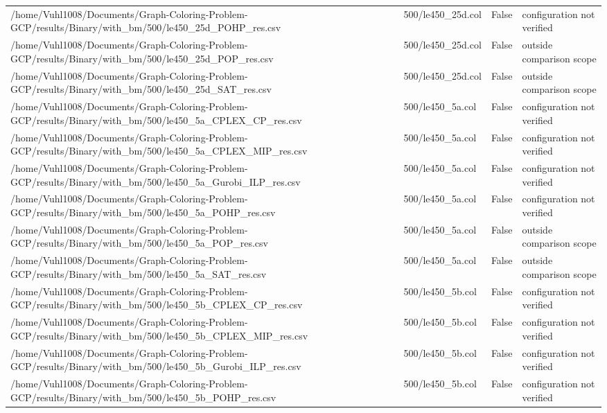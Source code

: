 \begin{table}[htbp]
\begin{tabular}{llll}
/home/Vuhl1008/Documents/Graph-Coloring-Problem-GCP/results/Binary/with\_bm/500/le450\_25d\_POHP\_res.csv & 500/le450\_25d.col & False & configuration not verified \\
/home/Vuhl1008/Documents/Graph-Coloring-Problem-GCP/results/Binary/with\_bm/500/le450\_25d\_POP\_res.csv & 500/le450\_25d.col & False & outside comparison scope \\
/home/Vuhl1008/Documents/Graph-Coloring-Problem-GCP/results/Binary/with\_bm/500/le450\_25d\_SAT\_res.csv & 500/le450\_25d.col & False & outside comparison scope \\
/home/Vuhl1008/Documents/Graph-Coloring-Problem-GCP/results/Binary/with\_bm/500/le450\_5a\_CPLEX\_CP\_res.csv & 500/le450\_5a.col & False & configuration not verified \\
/home/Vuhl1008/Documents/Graph-Coloring-Problem-GCP/results/Binary/with\_bm/500/le450\_5a\_CPLEX\_MIP\_res.csv & 500/le450\_5a.col & False & configuration not verified \\
/home/Vuhl1008/Documents/Graph-Coloring-Problem-GCP/results/Binary/with\_bm/500/le450\_5a\_Gurobi\_ILP\_res.csv & 500/le450\_5a.col & False & configuration not verified \\
/home/Vuhl1008/Documents/Graph-Coloring-Problem-GCP/results/Binary/with\_bm/500/le450\_5a\_POHP\_res.csv & 500/le450\_5a.col & False & configuration not verified \\
/home/Vuhl1008/Documents/Graph-Coloring-Problem-GCP/results/Binary/with\_bm/500/le450\_5a\_POP\_res.csv & 500/le450\_5a.col & False & outside comparison scope \\
/home/Vuhl1008/Documents/Graph-Coloring-Problem-GCP/results/Binary/with\_bm/500/le450\_5a\_SAT\_res.csv & 500/le450\_5a.col & False & outside comparison scope \\
/home/Vuhl1008/Documents/Graph-Coloring-Problem-GCP/results/Binary/with\_bm/500/le450\_5b\_CPLEX\_CP\_res.csv & 500/le450\_5b.col & False & configuration not verified \\
/home/Vuhl1008/Documents/Graph-Coloring-Problem-GCP/results/Binary/with\_bm/500/le450\_5b\_CPLEX\_MIP\_res.csv & 500/le450\_5b.col & False & configuration not verified \\
/home/Vuhl1008/Documents/Graph-Coloring-Problem-GCP/results/Binary/with\_bm/500/le450\_5b\_Gurobi\_ILP\_res.csv & 500/le450\_5b.col & False & configuration not verified \\
/home/Vuhl1008/Documents/Graph-Coloring-Problem-GCP/results/Binary/with\_bm/500/le450\_5b\_POHP\_res.csv & 500/le450\_5b.col & False & configuration not verified \\

\end{tabular}
\end{table}

